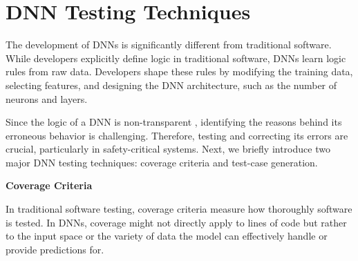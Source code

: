 
  
  
  





\section{DNN Testing Techniques}

The development of DNNs is significantly different from traditional software. While developers explicitly define logic in traditional software, DNNs learn logic rules from raw data. Developers shape these rules by modifying the training data, selecting features, and designing the DNN architecture, such as the number of neurons and layers.

Since the logic of a DNN is non-transparent \cite{deepxplore}, identifying the reasons behind its erroneous behavior is challenging. Therefore, testing and correcting its errors are crucial, particularly in safety-critical systems. Next, we briefly introduce two major DNN testing techniques: coverage criteria and test-case generation.

\smallskip\noindent%
\textbf{Coverage Criteria}

In traditional software testing, coverage criteria measure how thoroughly software is tested. In DNNs, coverage might not directly apply to lines of code but rather to the input space or the variety of data the model can effectively handle or provide predictions for.

